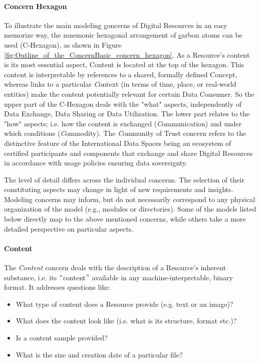 \paragraph{Concern Hexagon\\}
To illustrate the main modeling \uline{c}oncerns of Digital Resources in an easy memorize way, the mnemonic hexagonal arrangement of \uline{c}arbon atoms can be used (C-Hexagon), as shown in Figure \ref{fig:Outline_of_the_ConcernBasic_concern_hexagon}. As a Resource’s content is its most essential aspect, Content is located at the top of the hexagon. This content is interpretable by references to a shared, formally defined Concept, whereas links to a particular \textit{C}ontext\textit{ }(in terms of time, place, or real-world entities) make the content potentially relevant for certain Data Consumer. So the upper part of the C-Hexagon deals with the "what" aspects, independently of Data Exchange, Data Sharing or Data Utilization. The lower part relates to the "how" aspects; i.e. how the content is exchanged (\textit{C}ommunication) and under which conditions (\textit{C}ommodity). The \textit{C}ommunity of Trust concern refers to the distinctive feature of the International Data Spaces being an ecosystem of certified participants and components that exchange and share Digital Resources in accordance with usage policies ensuring data sovereignty.

The level of detail differs across the individual concerns. The selection of their constituting aspects may change in light of new requirements and insights. Modeling concerns may inform, but do not necessarily correspond to any physical organization of the model (e.g., modules or directories). Some of the models listed below directly map to the above mentioned concerns, while others take a more detailed perspective on particular aspects.

\paragraph{Content\\}


The \textit{Content }concern deals with the description of a Resource’s inherent substance, i.e. its $``$content$"$  available in any machine-interpretable, binary format. It addresses questions like: 
 \begin{itemize}
	\item What type of content does a Resource provide (e.g. text or an image)? 
 	\item What does the content look like (i.e. what is its structure, format etc.)? 
 	\item Is a content sample provided? 
 	\item What is the size and creation date of a particular file?
\end{itemize} 

